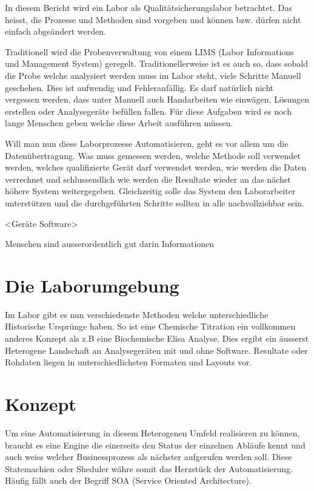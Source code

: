 \documentclass[paper=a4,twoside=false,BCOR=0mm,DIV=calc,fontsize=12pt]{scrartcl}
\begin{document}
In diesem Bericht wird ein Labor als Qualitätsicherungslabor betrachtet. Das heisst, die Prozesse und Methoden sind vorgeben und können bzw. dürfen nicht 
einfach abgeändert werden.

Traditionell wird die Probenverwaltung von einem LIMS (Labor Informations und Management System) geregelt. Traditionellerweise ist es auch so, dass
sobald die Probe welche analysiert werden muss im Labor steht, viele Schritte Manuell geschehen. Dies ist aufwendig und Fehleranfällig. 
Es darf natürlich nicht vergessen werden, dass unter Manuell auch Handarbeiten wie einwägen, Lösungen erstellen oder Analysegeräte befüllen fallen.
Für diese Aufgaben wird es noch lange Menschen geben welche diese Arbeit ausführen müssen.

Will man nun diese Laborprozesse Automatisieren, geht es vor allem um die Datenübertragung. 
Was muss gemessen werden, welche Methode soll verwendet werden,
welches qualifizierte Gerät darf verwendet werden, 
wie werden die Daten verrechnet und schlussendlich wie werden die Resultate wieder an das nächst höhere System weitergegeben.
Gleichzeitig solle das System den Laborarbeiter unterstützen und die durchgeführten Schritte sollten in alle nachvollziehbar sein.


<Geräte Software>



Menschen sind ausserordentlich gut darin Informationen 


\section{Die Laborumgebung}
Im Labor gibt es nun verschiedenste Methoden welche unterschiedliche Historische Ursprünge haben. So ist eine Chemische Titration ein
vollkommen anderes Konzept als z.B eine Biochemische Elisa Analyse.
Dies ergibt ein äusserst Heterogene Landschaft an Analysegeräten mit und ohne Software. Resultate oder Rohdaten liegen in unterschiedlichsten Formaten und Layouts vor.





\section{Konzept}
Um eine Automatisierung in diesem Heterogenen Umfeld realisieren zu können, braucht es eine Engine die einerseits den Status der einzelnen
Abläufe kennt und auch weiss welcher Businessprozess als nächster aufgerufen werden soll. Diese Statemachien oder Sheduler währe somit das
Herzstück der Automatisierung. Häufig fällt auch der Begriff SOA (Service Oriented Architecture).
\end{document}
